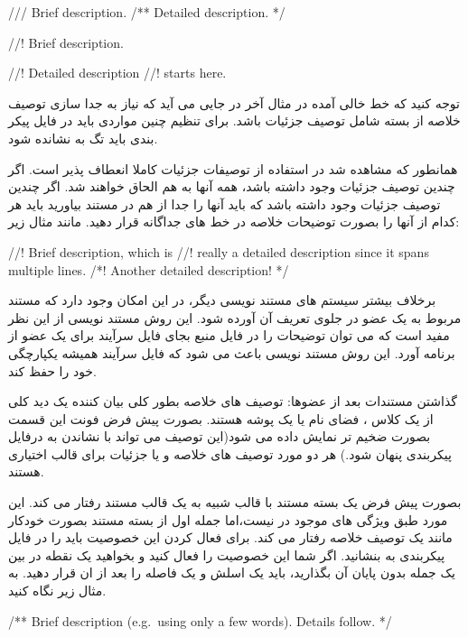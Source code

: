 \begin{C++}
/// Brief description.
/** Detailed description. */

//! Brief description.

//! Detailed description
//! starts here.
\end{C++}

توجه کنید که خط خالی آمده در مثال آخر در جایی می آید که نیاز به جدا سازی توصیف
خلاصه از بسته شامل توصیف جزئیات باشد.
برای تنظیم چنین مواردی باید در فایل پیکر بندی باید تگ  به
 نشانده شود.

همانطور که مشاهده شد در استفاده از توصیفات جزئیات  کاملا انعطاف پذیر
است. اگر چندین توصیف جزئیات وجود داشته باشد، همه آنها به هم الحاق خواهند شد.
اگر چندین توصیف جزئیات وجود داشته باشد که باید آنها را جدا از هم در مستند
بیاورید باید هر کدام از آنها را بصورت توضیحات خلاصه در خط های جداگانه قرار دهید.
مانند مثال زیر:

\begin{C++}
//! Brief description, which is
//! really a detailed description since it spans multiple lines.
/*! Another detailed description!
*/
\end{C++}

برخلاف بیشتر سیستم های مستند نویسی دیگر، در   این امکان وجود دارد که
مستند مربوط به یک عضو در جلوی تعریف آن آورده شود. این روش مستند نویسی از این نظر
مفید است که می توان توضیحات را در فایل منبع بجای فایل سرآیند برای یک عضو از
برنامه آورد. این روش مستند نویسی باعث می شود که فایل سرآیند همیشه یکپارچگی خود
را حفظ کند.

گذاشتن مستندات بعد از عضوها:
توصیف های خلاصه بطور کلی بیان کننده یک دید کلی از یک کلاس ، فضای نام یا یک پوشه
هستند. بصورت پیش فرض فونت این قسمت بصورت ضخیم تر نمایش داده می شود(این توصیف می
تواند با نشاندن  به درفایل پیکربندی پنهان شود.) هر دو مورد
توصیف های خلاصه و یا جزئیات برای قالب  اختیاری هستند.

بصورت پیش فرض یک بسته مستند با قالب  شبیه به یک قالب مستند 
رفتار می کند.
این مورد طبق ویژگی های موجود در  نیست،اما جمله اول از بسته مستند
بصورت خودکار مانند یک توصیف خلاصه رفتار می کند.
برای فعال کردن این خصوصیت باید
 را در فایل پیکربندی به  بنشانید. اگر شما این
خصوصیت را فعال کنید و بخواهید یک نقطه در بین یک جمله بدون پایان آن بگذارید،
باید یک اسلش و یک فاصله را بعد از ان قرار دهید. به مثال زیر نگاه کنید.

\begin{C++}
/** Brief description (e.g.\ using only a few words). Details follow. */
\end{C++}

